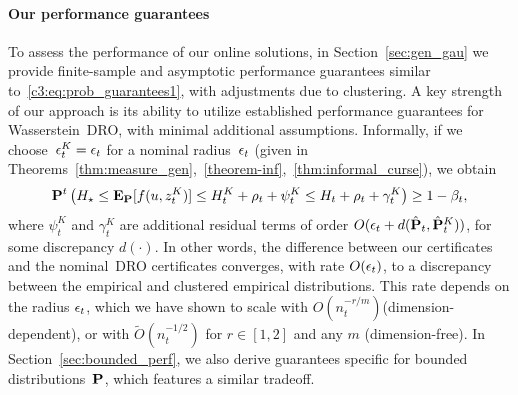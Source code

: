 \paragraph{Our performance guarantees} To assess the performance of our online solutions, in Section~\ref{sec:gen_gau} we provide finite-sample and asymptotic performance guarantees similar to~\eqref{c3:eq:prob_guarantees1}, with adjustments due to clustering. 
A key strength of our approach is its ability to utilize established performance guarantees for Wasserstein~\gls{DRO}, with minimal additional assumptions.
Informally, if we choose~$\epsilon_t^K = \epsilon_t$ for a nominal radius~$\epsilon_t$ (given in Theorems~\ref{thm:measure_gen},~\ref{theorem-inf},~\ref{thm:informal_curse}), we obtain
\begin{equation}
\label{eq:informal}
{\mathbf P}^{t}\left( H_\star \leq \mathbf{E}_{{\mathbf P}}[f(u, z^K_t)] \le H^K_t + \rho_{t}+\psi^K_{t} \leq H_t +  \rho_{t}+\gamma^K_{t}\right) \ge 1 - \beta_{t},
\end{equation}
where $\psi^K_{t}$ and $\gamma^K_{t}$ are additional residual terms of order $O(\epsilon_{t}+d(\hat{{\mathbf P}}_{t},\hat{{\mathbf P}}_{t}^K))$,
for some discrepancy $d(\cdot)$.
In other words, the difference between our certificates and the nominal~\gls{DRO} certificates converges, with rate $O(\epsilon_t)$, to a discrepancy between the empirical and clustered empirical distributions. This rate depends on the radius $\epsilon_t$, which we have shown to scale with $O(n_t^{-r/m})$(dimension-dependent), or with $\tilde{O}(n_t^{-1/2})$ for $r \in [1,2]$ and any $m$ (dimension-free).
In Section~\ref{sec:bounded_perf}, we also derive guarantees specific for bounded distributions~${\mathbf P}$, which features a similar tradeoff. 

